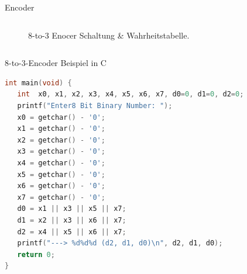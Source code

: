 \documentclass[12pt%
,xcolor=table
,aspectratio=169%
]{beamer}
\begin{document}
\begin{frame}{Encoder}
\begin{columns}[T]
\begin{column}{.48\textwidth}
\begin{figure}
\caption{8-to-3 Enocer Schaltung \& Wahrheitstabelle.}
\end{figure}
\end{column}%
\end{columns}
\end{frame}

\begin{frame}[fragile]{8-to-3-Encoder Beispiel in C}
\begin{lstlisting}[language=C]
int main(void) {
   int  x0, x1, x2, x3, x4, x5, x6, x7, d0=0, d1=0, d2=0;
   printf("Enter8 Bit Binary Number: ");
   x0 = getchar() - '0';
   x1 = getchar() - '0';
   x2 = getchar() - '0';
   x3 = getchar() - '0';
   x4 = getchar() - '0';
   x5 = getchar() - '0';
   x6 = getchar() - '0';
   x7 = getchar() - '0';
   d0 = x1 || x3 || x5 || x7;
   d1 = x2 || x3 || x6 || x7;
   d2 = x4 || x5 || x6 || x7;
   printf("---> %d%d%d (d2, d1, d0)\n", d2, d1, d0);
   return 0;
}
\end{lstlisting}
\end{frame}
\end{document}
